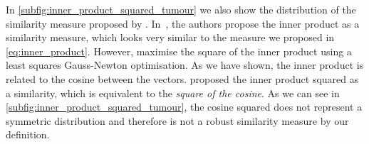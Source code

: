 In \cref{subfig:inner_product_squared_tumour} we also show the
distribution of the similarity measure proposed by \citet{haber2006intensity}. 
In~\cite{haber2006intensity}, the authors propose the inner product as a
similarity measure, which looks very similar to the measure we proposed in
\cref{eq:inner_product}. However, \citet{haber2006intensity} maximise the square of the
inner product using a least squares Gauss-Newton optimisation. As we have shown,
the inner product is related to the cosine between the vectors.
\citet{haber2006intensity} proposed the inner product squared as
a similarity, which is equivalent to the \textit{square of the cosine}. As we
can see in \cref{subfig:inner_product_squared_tumour}, the cosine squared
does not represent a symmetric distribution and therefore is not a robust
similarity measure by our definition.
